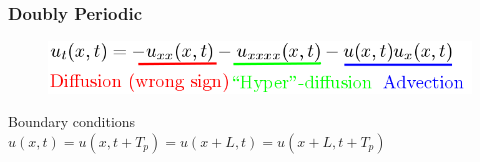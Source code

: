 \documentclass[mathserif, handout]{beamer}
\title[Tiling Infinite Space-time] %
{}
\subtitle{Spatiotemporal Tiling of the \KSe\, }
\author[M. Gudorf] %
{Matthew Gudorf %
}
\institute[GAtech] %
{
  Center for Nonlinear Science \\
  School of Physics \\
  Georgia Institute of Technology
}
\date[Physics Forum] %
{ Adviser: Prof. Predrag Cvitanovi\'c \\ \vspace{1em}
    Happy Birthday Dad! 2018
} %
\begin{document}
\frame{\titlepage} %






\begin{frame}
  \frametitle{ Doubly Periodic \KSe\ }
\begin{figure}[h]
\includegraphics[width=.8\textwidth]{MNG_annotatedks}
\end{figure}
Boundary conditions $u(x,t)=u(x,t+T_p)=u(x+L,t)=u(x+L,t+T_p)$
\end{frame}


\end{document}
